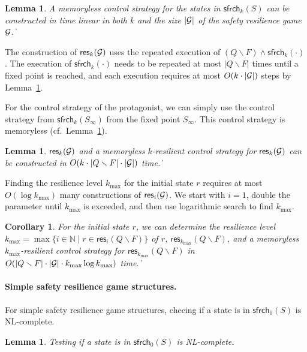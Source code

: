 \documentclass[times,10pt,twocolumn]{article}
\newtheorem{lemma}[theorem]{Lemma}
\newtheorem{corollary}[theorem]{Corollary}
\newcommand\res{\mathsf{res}}
\newcommand\safe{\mathsf{sfrch}}
\newcommand\qed{\hfill\ensuremath{\Box}}
\newcommand{\nnneg}{{\mathbb N}}
\newcommand{\calg}{{\cal G}}
\def\qed{\ifmmode\|\else{\unskip\nobreak\hfil
\penalty50\hskip1em\null\nobreak\hfil$\blacksquare$
\parfillskip=0pt\finalhyphendemerits=0\endgraf}\fi}
\begin{document}
\begin{lemma}
\label{lem:costSafe}
A memoryless control strategy for the states in $\safe_k(S)$ can be
constructed in time linear in both $k$ and the 
size $|\calg|$ of the safety resilience game $\calg$.
\qed
\end{lemma}





The construction of $\res_k(\calg)$ uses the repeated execution 
of $(Q\smallsetminus F)\wedge\safe_k(\cdot)$.
The execution of $\safe_k(\cdot)$ needs to be repeated 
at most $|Q\smallsetminus F|$ times until a fixed point is reached, 
and each execution requires at most $O(k\cdot|\calg|)$ 
steps by Lemma~\ref{lem:costSafe}.

For the control strategy of the protagonist, 
we can simply use the control strategy from $\safe_k(S_\infty)$ 
from the fixed point $S_\infty$.
This control strategy is memoryless (cf.\ Lemma~\ref{lem:costSafe}).
\begin{lemma}
\label{lem:costRes}
$\res_k(\calg)$ and a memoryless $k$-resilient control strategy 
for $\res_k(\calg)$ can be constructed 
in $O(k\cdot |Q\smallsetminus F| \cdot |\calg|)$ time.
\qed
\end{lemma}


Finding the resilience level $k_{\max}$ for the initial state $r$
requires at most $O(\log k_{\max})$ many constructions of $\res_i(\calg)$.
We start with $i=1$, double the parameter until $k_{\max}$ 
is exceeded, and then use logarithmic search to find $k_{\max}$.

\begin{corollary}
For the initial state $r$, we can determine the resilience level 
$k_{\max} =
\max\{i\in \nnneg \mid r \in \res_i(Q \smallsetminus F)\}$ of $r$,
$\res_{k_{\max}}(Q \smallsetminus F)$, 
and a memoryless $k_{\max}$-resilient control
strategy for $\res_{k_{\max}}(Q\smallsetminus F)$ in 
$O(|Q\smallsetminus F| \cdot |\calg|\cdot k_{\max} \log k_{\max})$ time.
\qed
\end{corollary}




\paragraph{Simple safety resilience game structures.}
For simple  safety resilience game structures, checing if a state is in $\safe_0(S)$ is NL-complete\label{reply1.NL.complete}.
\begin{lemma}
\label{lem:oldNLSafe0}
Testing if a state is in $\safe_0(S)$ is NL-complete.
\end{lemma}
\end{document}
